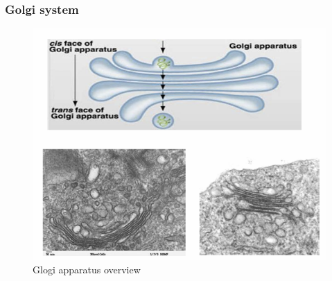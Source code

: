 \documentclass[../main.tex]{subfiles}
\begin{document}
\subsubsection{Golgi system}
\begin{figure}[H]
    \centering
    \includegraphics[width=0.5\linewidth]{Golgi.png}
    \caption{Glogi apparatus overview}
    \label{fig:enter-label}
\end{figure}
\end{document}
